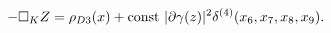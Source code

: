 \begin{equation} 
- \Box_K Z=\rho_{D3}(x) + {\rm const}~
|\partial\gamma(z)|^2\delta^{(4)}(x_6,x_7,x_8,x_9).
\label{7} 
\end{equation} 
